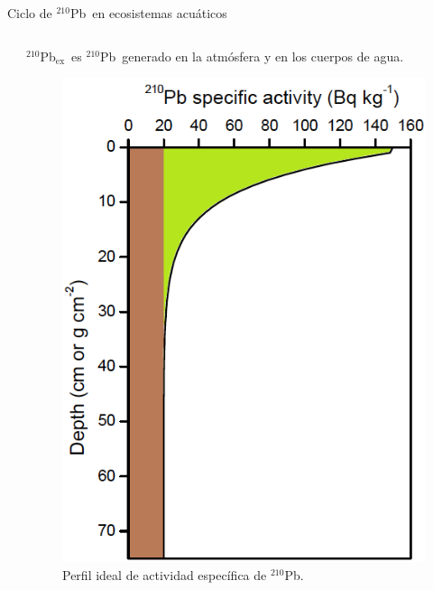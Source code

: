 \documentclass[9pt]{beamer}
\newcommand{\PbCero}{$^{210}$Pb}
\newcommand{\PbCeroEx}{$^{210}$Pb$_\text{ex}$}
\begin{document}
\begin{frame}{Ciclo de \PbCero\, en ecosistemas acuáticos}
\begin{columns}
\begin{column}{0.7 \textwidth}
		\end{column}
		\begin{column}{0.27\textwidth}  
			\justifying
			\PbCeroEx\, es \PbCero\, generado en la atmósfera y en los cuerpos de agua.
			\begin{figure}
		\centering
		\includegraphics[width=\textwidth]{Imagenes/PerfilIdeal-2.png}
		\caption{\justifying Perfil ideal de actividad específica de \PbCero\footnotemark[1].}
	\end{figure}			
			
		\end{column}
	\end{columns}
\end{frame}
\end{document}
